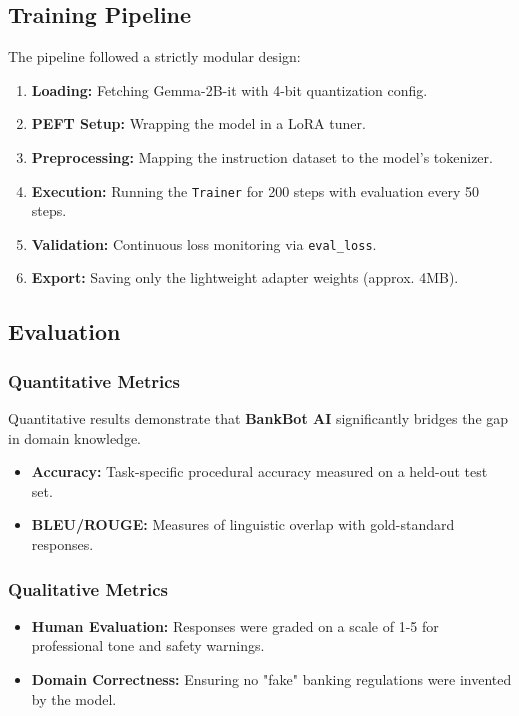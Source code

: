 \documentclass[12pt,a4paper]{article}
\begin{document}
\subsection{Training Pipeline}
The pipeline followed a strictly modular design:
\begin{enumerate}
    \item \textbf{Loading:} Fetching Gemma-2B-it with 4-bit quantization config.
    \item \textbf{PEFT Setup:} Wrapping the model in a LoRA tuner.
    \item \textbf{Preprocessing:} Mapping the instruction dataset to the model's tokenizer.
    \item \textbf{Execution:} Running the \texttt{Trainer} for 200 steps with evaluation every 50 steps.
    \item \textbf{Validation:} Continuous loss monitoring via \texttt{eval_loss}.
    \item \textbf{Export:} Saving only the lightweight adapter weights (approx. 4MB).
\end{enumerate}

\newpage
\subsection{Evaluation}

\subsubsection{Quantitative Metrics}
Quantitative results demonstrate that \textbf{BankBot AI} significantly bridges the gap in domain knowledge.

\begin{itemize}
    \item \textbf{Accuracy:} Task-specific procedural accuracy measured on a held-out test set.
    \item \textbf{BLEU/ROUGE:} Measures of linguistic overlap with gold-standard responses.
\end{itemize}

\subsubsection{Qualitative Metrics}
\begin{itemize}
    \item \textbf{Human Evaluation:} Responses were graded on a scale of 1-5 for professional tone and safety warnings.
    \item \textbf{Domain Correctness:} Ensuring no "fake" banking regulations were invented by the model.
\end{itemize}
\end{document}
